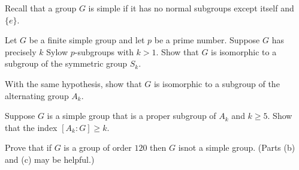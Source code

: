 Recall that a group $G$ is simple if it has no normal subgroups except
itself and $\{e\}$.
\begin{alist}
\item Let $G$ be a finite simple group and let $p$ be a prime number. 
Suppose $G$ has precisely $k$ Sylow $p$-subgroups with $k>1$. Show
that $G$ is isomorphic to a subgroup of the symmetric group $S_k$.
\item With the same hypothesis, show that $G$ is isomorphic to a
subgroup of the alternating group $A_k$.
\item Suppose $G$ is a simple group that is a proper subgroup
of $A_k$ and $k\geq 5$. Show that the index $[A_k:G]\geq k$.
\item Prove that if $G$ is a group of order $120$ then $G$ isnot
a simple group. (Parts (b) and (c) may be helpful.)
\end{alist}
